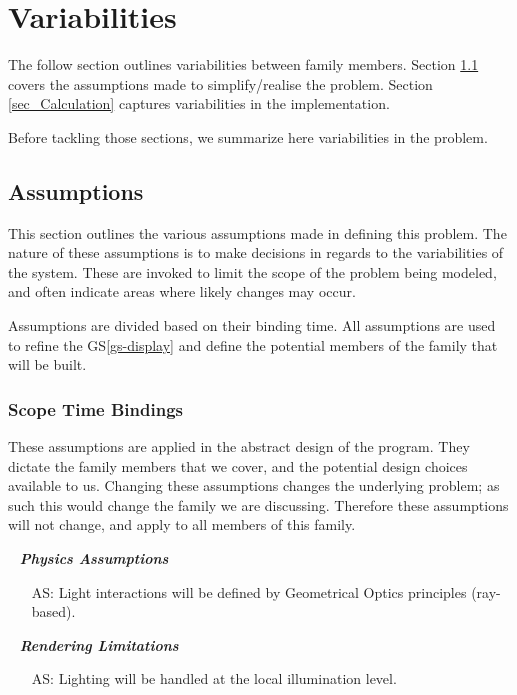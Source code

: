 \documentclass[12pt]{article}
\newcounter{assumpnum} %
\newcounter{assumpnumS} %
\newcommand{\gsref}[1]{GS\ref{#1}}
\begin{document}
\section{Variabilities}
The follow section outlines variabilities between family members. Section 
\ref{sec_Assumptions} covers the assumptions made to simplify/realise the 
problem. Section \ref{sec_Calculation} captures variabilities in the 
implementation.

Before tackling those sections, we summarize here variabilities in the problem.

\subsection{Assumptions} \label{sec_Assumptions}
This section outlines the various assumptions made in defining this problem.   
The nature of these assumptions is to make decisions in regards to the 
variabilities of the system. These are invoked to limit the scope of the 
problem being modeled, and often indicate areas where likely changes may occur.

Assumptions are divided based on their binding time. All assumptions are used 
to refine the \gsref{gs-display} and define the potential members of the 
family that will be built.

\subsubsection{Scope Time Bindings}
These assumptions are applied in the abstract design of the program. They 
dictate the family members that we cover, and the potential design choices 
available to us. Changing these assumptions changes the underlying problem; as 
such this would change the family we are discussing. Therefore these 
assumptions will not change, and apply to all members of this family.

~\newline
\textbf{\emph{Physics Assumptions}}
\begin{itemize}
	\item[AS\refstepcounter{assumpnumS}\theassumpnumS\label{as-geometrical_appx}:]
	Light interactions will be defined by Geometrical Optics principles 
	(ray-based).
\end{itemize}

~\newline
\textbf{\emph{Rendering Limitations}}
\begin{itemize}
	\item[AS\refstepcounter{assumpnumS}\theassumpnumS\label{as-illumination}:]
	Lighting will be handled at the local illumination level.
\end{itemize}
\end{document}
